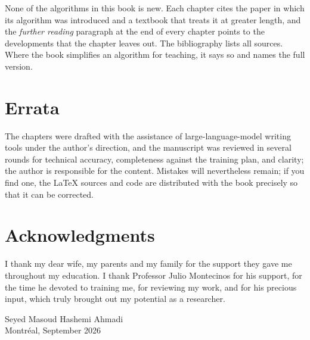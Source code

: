 None of the algorithms in this book is new. Each chapter cites the paper in which its
algorithm was introduced and a textbook that treats it at greater length, and the
\emph{further reading} paragraph at the end of every chapter points to the
developments that the chapter leaves out. The bibliography lists all sources. Where
the book simplifies an algorithm for teaching, it says so and names the full version.

\section*{Errata}

The chapters were drafted with the assistance of large-language-model writing tools
under the author's direction, and the manuscript was reviewed in several rounds for
technical accuracy, completeness against the training plan, and clarity; the author is
responsible for the content. Mistakes will nevertheless remain; if you find
one, the \LaTeX{} sources and code are distributed with the book precisely so that it
can be corrected.

\section*{Acknowledgments}

I thank my dear wife, my parents and my family for the support they gave me throughout
my education. I thank Professor Julio Montecinos for his support, for the time he
devoted to training me, for reviewing my work, and for his precious input, which truly
brought out my potential as a researcher.

\bigskip
\noindent Seyed Masoud Hashemi Ahmadi\\
Montréal, September 2026
